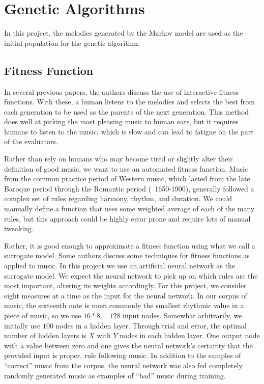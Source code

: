 \chapter{Genetic Algorithms} \label{ga}

In this project, the melodies generated by the Markov model are used as the initial population for the genetic algorithm.

\section{Fitness Function} \label{ga:fitness}

In several previous papers, the authors discuss the use of interactive fitness functions.
With these, a human listens to the melodies and selects the best from each generation to be used as the parents of the next generation.
This method does well at picking the most pleasing music to human ears, but it requires humans to listen to the music, which is slow and can lead to fatigue on the part of the evaluators.

Rather than rely on humans who may become tired or slightly alter their definition of good music, we want to use an automated fitness function.
Music from the common practice period of Western music, which lasted from the late Baroque period through the Romantic period (~1650-1900), generally followed a complex set of rules regarding harmony, rhythm, and duration.
We could manually define a function that uses some weighted average of each of the many rules, but this approach could be highly error prone and require lots of manual tweaking.

Rather, it is good enough to approximate a fitness function using what we call a surrogate model. %
Some authors discuss some techniques for fitness functions as applied to music.
In this project we use an artificial neural network as the surrogate model.
We expect the neural network to pick up on which rules are the most important, altering its weights accordingly.
For this project, we consider eight measures at a time as the input for the neural network.
In our corpus of music, the sixteenth note is most commonly the smallest rhythmic value in a piece of music, so we use $16 * 8 = 128$ input nodes.
Somewhat arbitrarily, we initially use $100$ nodes in a hidden layer.
Through trial and error, the optimal number of hidden layers is $X$ with $Y$ nodes in each hidden layer. %
One output node with a value between zero and one gives the neural network's certainty that the provided input is proper, rule following music.
In addition to the samples of ``correct'' music from the corpus, the neural network was also fed completely randomly generated music as examples of ``bad'' music during training.

